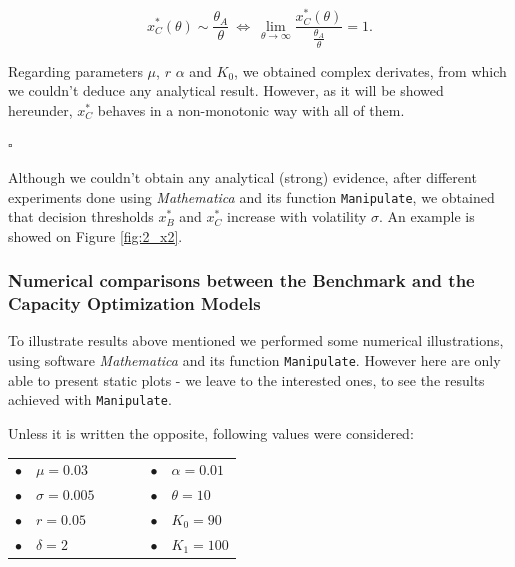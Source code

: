 $$x^*_C(\theta) \sim \frac{\theta_A}{\theta} \ \Leftrightarrow \ \lim_{\theta \to \infty} \frac{x^*_C(\theta)}{\frac{\theta_A}{\theta}}=1.$$

Regarding parameters $\mu$, $r$ $\alpha$ and $K_0$, we obtained complex derivates, from which we couldn't deduce any analytical result. However, as it will be showed hereunder, $x^*_C$ behaves in a non-monotonic way with all of them.
\begin{flushright}
	$\square$
\end{flushright}


Although we couldn't obtain any analytical (strong) evidence, after different experiments done using \textit{Mathematica} and its function \texttt{Manipulate}, we obtained that decision thresholds $x^*_B$ and $x^*_C$ increase with volatility $\sigma$. An example is showed on Figure \ref{fig:2_x2}.

\subsubsection{Numerical comparisons between the Benchmark and the Capacity Optimization Models}

To illustrate results above mentioned we performed some numerical illustrations, using software \textit{Mathematica} and its function \texttt{Manipulate}. However here are only able to present static plots - we leave to the interested ones, to see the results achieved with \texttt{Manipulate}.

Unless it is written the opposite, following values were considered:
\begin{table}[!htb]
	\centering
	\begin{tabular}{lllllll}
		$\bullet$ & $\mu=0.03$     &  & \hspace{7cm} &  &  $\bullet$ & $\alpha=0.01$ \\
		$\bullet$ & $\sigma=0.005$ &  & \hspace{7cm} &  &  $\bullet$ & $\theta=10$   \\
		$\bullet$ & $r=0.05$       &  & \hspace{7cm} &  &  $\bullet$ & $K_0=90$       \\
		$\bullet$ & $\delta=2$     &  & \hspace{7cm} & &  $\bullet$ & $K_1=100$                                   
	\end{tabular}
\end{table}




